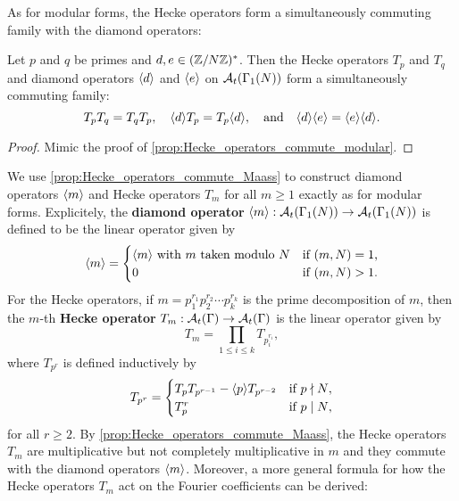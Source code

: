       As for modular forms, the Hecke operators form a simultaneously commuting family with the diamond operators:

      \begin{proposition}\label{prop:Hecke_operators_commute_Maass}
        Let $p$ and $q$ be primes and $d,e \in (\mathbb{Z}/N\mathbb{Z})^{\ast}$. Then the Hecke operators $T_{p}$ and $T_{q}$ and diamond operators $\langle d\rangle$ and $\langle e\rangle$ on $\mathcal{A}_{t}(\Gamma_{1}(N))$ form a simultaneously commuting family:
        \[
          T_{p}T_{q} = T_{q}T_{p}, \quad \langle d\rangle T_{p} = T_{p}\langle d\rangle, \quad \text{and} \quad \langle d\rangle\langle e\rangle = \langle e\rangle\langle d\rangle.
        \]
      \end{proposition}
      \begin{proof}
        Mimic the proof of \cref{prop:Hecke_operators_commute_modular}.
      \end{proof}

      We use \cref{prop:Hecke_operators_commute_Maass} to construct diamond operators $\langle m\rangle$ and Hecke operators $T_{m}$ for all $m \ge 1$ exactly as for modular forms. Explicitely, the \textbf{diamond operator} $\langle m\rangle:\mathcal{A}_{t}(\Gamma_{1}(N)) \to \mathcal{A}_{t}(\Gamma_{1}(N))$ is defined to be the linear operator given by
      \[
        \langle m\rangle = \begin{cases} \langle m\rangle \text{ with $m$ taken modulo $N$} & \text{if $(m,N) = 1$,} \\ 0 & \text{if $(m,N) > 1$.} \end{cases}
      \]
      For the Hecke operators, if $m = p_{1}^{r_{1}}p_{2}^{r_{2}} \cdots p_{k}^{r_{k}}$ is the prime decomposition of $m$, then the $m$-th \textbf{Hecke operator} $T_{m}:\mathcal{A}_{t}(\Gamma) \to \mathcal{A}_{t}(\Gamma)$ is the linear operator given by
      \[
        T_{m} = \prod_{1 \le i \le k}T_{p_{i}^{r_{i}}},
      \]
      where $T_{p^{r}}$ is defined inductively by
      \[
        T_{p^{r}} = \begin{cases} T_{p}T_{p^{r-1}}-\langle p\rangle T_{p^{r-2}} & \text{if $p \nmid N$}, \\ T_{p}^{r} & \text{if $p \mid N$}, \end{cases}
      \]
      for all $r \ge 2$. By \cref{prop:Hecke_operators_commute_Maass}, the Hecke operators $T_{m}$ are multiplicative but not completely multiplicative in $m$ and they commute with the diamond operators $\langle m\rangle$. Moreover, a more general formula for how the Hecke operators $T_{m}$ act on the Fourier coefficients can be derived:

